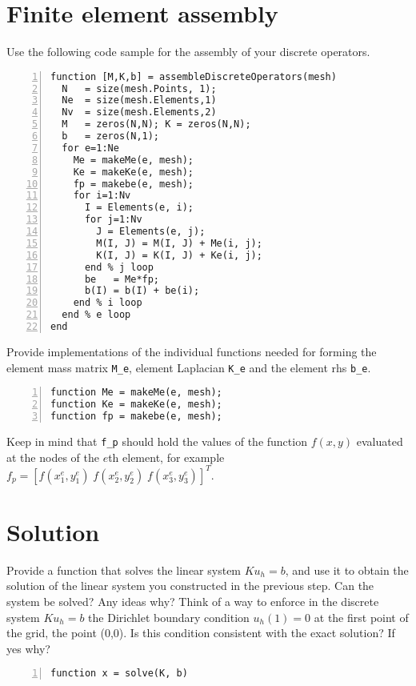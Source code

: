 \documentclass[unicode,11pt,a4paper,oneside,numbers=endperiod,openany]{scrartcl}
\begin{document}
\section{Finite element assembly}
Use the following code sample for the assembly of your discrete operators.
\begin{lstlisting}[numbers=left, numberstyle=\tiny, stepnumber=1, numbersep=10pt]
function [M,K,b] = assembleDiscreteOperators(mesh)
  N   = size(mesh.Points, 1);
  Ne  = size(mesh.Elements,1)
  Nv  = size(mesh.Elements,2)
  M   = zeros(N,N); K = zeros(N,N);
  b   = zeros(N,1);
  for e=1:Ne
    Me = makeMe(e, mesh);
    Ke = makeKe(e, mesh);
    fp = makebe(e, mesh);
    for i=1:Nv
      I = Elements(e, i);
      for j=1:Nv
        J = Elements(e, j);
        M(I, J) = M(I, J) + Me(i, j);
        K(I, J) = K(I, J) + Ke(i, j);
      end % j loop
      be   = Me*fp;
      b(I) = b(I) + be(i);
    end % i loop
  end % e loop
end
\end{lstlisting}
Provide implementations of the individual 
functions needed for forming the element mass matrix \lstinline+M_e+, element Laplacian \lstinline+K_e+ 
and the element rhs \lstinline+b_e+. 
\begin{lstlisting}[numbers=left, numberstyle=\tiny, stepnumber=1, numbersep=10pt, identifierstyle=\ttfamily\color{Red}\bfseries] 
function Me = makeMe(e, mesh);
function Ke = makeKe(e, mesh);
function fp = makebe(e, mesh);
\end{lstlisting}
Keep in mind that \lstinline+f_p+ should hold the values of the function $f(x,y)$
evaluated at the nodes of the $e$th element,  for example
$f_p = \left [ f(x^e_1, y^e_1) \; f(x^e_2, y^e_2) \; f(x^e_3, y^e_3)  \right ]^T$.


\section{Solution}
Provide a function that solves the linear system $K u_h = b$, and use it to obtain the solution of the linear system
you constructed in the previous step. Can the system be solved? Any ideas why? Think of a way to enforce in the discrete 
system $K u_h = b$ the Dirichlet boundary condition $u_h(1) = 0$ at the first point of the grid, the point (0,0). 
Is this condition consistent with the exact solution?
If yes why? 
\begin{lstlisting}[numbers=left, numberstyle=\tiny, stepnumber=1, numbersep=10pt, identifierstyle=\ttfamily\color{Red}\bfseries] 
function x = solve(K, b)
\end{lstlisting}
\end{document}
